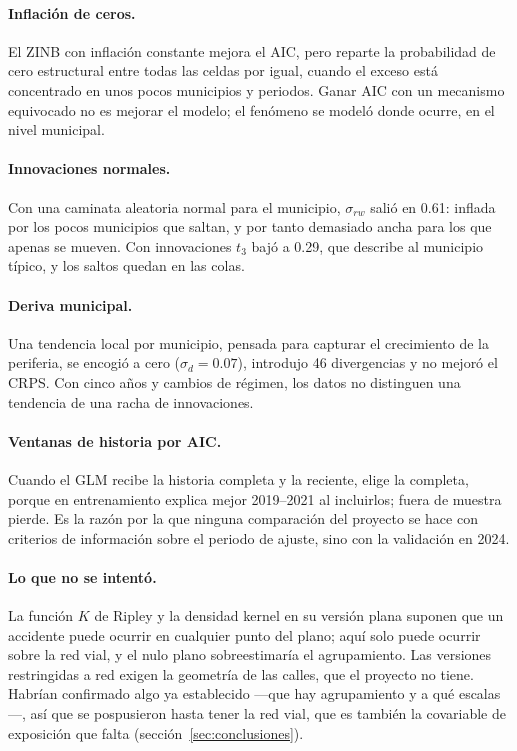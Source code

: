 \paragraph{Inflación de ceros.} El ZINB con inflación constante mejora el AIC,
pero reparte la probabilidad de cero estructural entre todas las celdas por
igual, cuando el exceso está concentrado en unos pocos municipios y periodos.
Ganar AIC con un mecanismo equivocado no es mejorar el modelo; el fenómeno se
modeló donde ocurre, en el nivel municipal.

\paragraph{Innovaciones normales.} Con una caminata aleatoria normal para el
municipio, $\sigma_{rw}$ salió en 0.61: inflada por los pocos municipios que
saltan, y por tanto demasiado ancha para los que apenas se mueven. Con
innovaciones $t_3$ bajó a 0.29, que describe al municipio típico, y los saltos
quedan en las colas.

\paragraph{Deriva municipal.} Una tendencia local por municipio, pensada para
capturar el crecimiento de la periferia, se encogió a cero ($\sigma_d = 0.07$),
introdujo 46 divergencias y no mejoró el CRPS. Con cinco años y cambios de
régimen, los datos no distinguen una tendencia de una racha de innovaciones.

\paragraph{Ventanas de historia por AIC.} Cuando el GLM recibe la historia
completa y la reciente, elige la completa, porque en entrenamiento explica
mejor 2019--2021 al incluirlos; fuera de muestra pierde. Es la razón por la que
ninguna comparación del proyecto se hace con criterios de información sobre
el periodo de ajuste, sino con la validación en 2024.

\paragraph{Lo que no se intentó.} La función $K$ de Ripley y la densidad kernel
en su versión plana suponen que un accidente puede ocurrir en cualquier punto
del plano; aquí solo puede ocurrir sobre la red vial, y el nulo plano
sobreestimaría el agrupamiento. Las versiones restringidas a red
\parencite{okabe2001} exigen la geometría de las calles, que el proyecto no tiene.
Habrían confirmado algo ya establecido —que hay agrupamiento y a qué escalas—,
así que se pospusieron hasta tener la red vial, que es también la covariable
de exposición que falta (sección~\ref{sec:conclusiones}).
